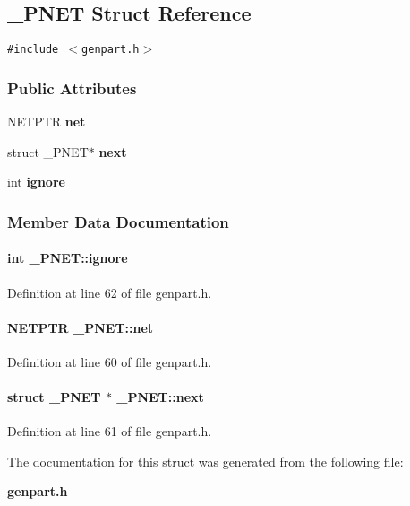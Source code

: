 \subsection{\_\-PNET  Struct Reference}
\label{_PNET}
{\tt \#include $<$genpart.h$>$}

\subsubsection*{Public Attributes}
\begin{CompactItemize}
\item 
NETPTR {\bf net}
\item 
struct \_\-PNET$\ast$ {\bf next}
\item 
int {\bf ignore}
\end{CompactItemize}


\subsubsection{Member Data Documentation}
\label{_PNET_m2}
\paragraph{\setlength{\rightskip}{0pt plus 5cm}int \_\-PNET::ignore}\hfill



Definition at line 62 of file genpart.h.\label{_PNET_m0}
\paragraph{\setlength{\rightskip}{0pt plus 5cm}NETPTR \_\-PNET::net}\hfill



Definition at line 60 of file genpart.h.\label{_PNET_m1}
\paragraph{\setlength{\rightskip}{0pt plus 5cm}struct \_\-PNET $\ast$ \_\-PNET::next}\hfill



Definition at line 61 of file genpart.h.

The documentation for this struct was generated from the following file:\begin{CompactItemize}
\item 
{\bf genpart.h}\end{CompactItemize}
